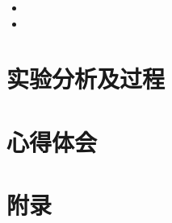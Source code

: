 \begin{itemize}
  \item
  \item
\end{itemize}

\section{实验分析及过程}

% 

\section{心得体会}

% 

\newpage{}
\section{附录}


